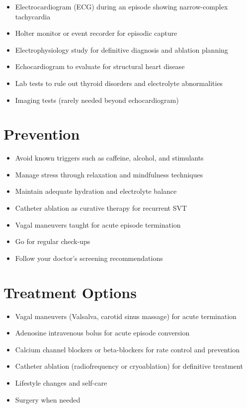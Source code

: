 \begin{itemize}[noitemsep]
  \item Electrocardiogram (ECG) during an episode showing narrow-complex tachycardia
  \item Holter monitor or event recorder for episodic capture
  \item Electrophysiology study for definitive diagnosis and ablation planning
  \item Echocardiogram to evaluate for structural heart disease
  \item Lab tests to rule out thyroid disorders and electrolyte abnormalities
  \item Imaging tests (rarely needed beyond echocardiogram)
\end{itemize}

\section{Prevention}

\begin{itemize}[noitemsep]
  \item Avoid known triggers such as caffeine, alcohol, and stimulants
  \item Manage stress through relaxation and mindfulness techniques
  \item Maintain adequate hydration and electrolyte balance
  \item Catheter ablation as curative therapy for recurrent SVT
  \item Vagal maneuvers taught for acute episode termination
  \item Go for regular check-ups
  \item Follow your doctor's screening recommendations
\end{itemize}

\section{Treatment Options}

\begin{itemize}[noitemsep]
  \item Vagal maneuvers (Valsalva, carotid sinus massage) for acute termination
  \item Adenosine intravenous bolus for acute episode conversion
  \item Calcium channel blockers or beta-blockers for rate control and prevention
  \item Catheter ablation (radiofrequency or cryoablation) for definitive treatment
  \item Lifestyle changes and self-care
  \item Surgery when needed
\end{itemize}

